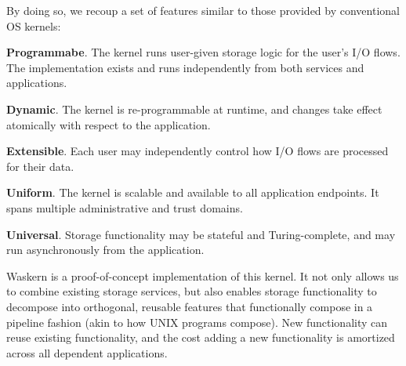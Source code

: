 By doing so, we recoup a set of features similar to those provided by
conventional OS kernels:

\textbf{Programmabe}. The kernel runs user-given storage logic for the user's
I/O flows.  The implementation exists and runs independently from both
services and applications.

\textbf{Dynamic}. The kernel is re-programmable at
runtime, and changes take effect atomically with respect to the application.

\textbf{Extensible}.  Each user may independently control how I/O flows are
processed for their data.

\textbf{Uniform}.  The kernel is scalable and available to all
application endpoints. It spans multiple administrative and trust
domains.

\textbf{Universal}.  Storage functionality may be stateful and
Turing-complete, and may run asynchronously from the application.

Waskern is a proof-of-concept implementation of this kernel. It not only
allows us to combine existing storage services, but also enables storage
functionality to decompose into orthogonal, reusable features that
functionally compose in a pipeline fashion (akin to how UNIX programs
compose).  New functionality can reuse existing functionality, and the
cost adding a new functionality is amortized across all dependent applications.
